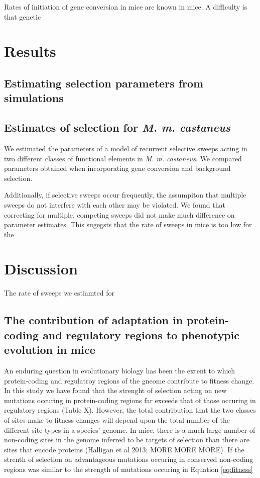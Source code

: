 \documentclass{article}
\begin{document}
	Rates of initiation of gene conversion in mice are known in mice.
A difficulty is that genetic 
 
 

\section*{Results}
\subsection*{Estimating selection parameters from simulations}


\subsection*{Estimates of selection for \textit{M. m. castaneus}}

	We estimated the parameters of a model of recurrent selective sweeps acting in two different classes of functional elements in \textit{M. m. castaneus}. We compared parameters obtained when incorporating gene conversion and background selection.
	
	Additionally, if selective sweeps occur frequently, the assumpiton that multiple sweeps do not interfere with each other may be violated. We found that correcting for multiple, competing sweeps did not make much difference on parameter estimates. This sugegsts that the rate of sweeps in mice is too low for the 




\section*{Discussion}

The rate of sweeps we estiamted for 

\subsection*{The contribution of adaptation in protein-coding and regulatory regions to phenotypic evolution in mice}

An enduring question in evolutionary biology has been the extent to which protein-coding and regulatroy regions of the gneome contribute to fitness change. In this study we have found that the strenght of selection acting on new mutations occuring in protein-coding regions far exceeds that of those occuring in regulatory regions (Table X). However, the total contribution that the two classes of sites make to fitness changes will depend upon the total number of the different site types in a species' genome. In mice, there is a much large number of non-coding sites in the genome inferred to be targets of selection than there are sites that encode proteins (Halligan et al 2013; MORE MORE MORE). If the strenth of selection on advantageous mutations occuring in conserved non-coding regions was similar to the strength of mutations occuring in Equation \ref{eq:fitness}
\end{document}
